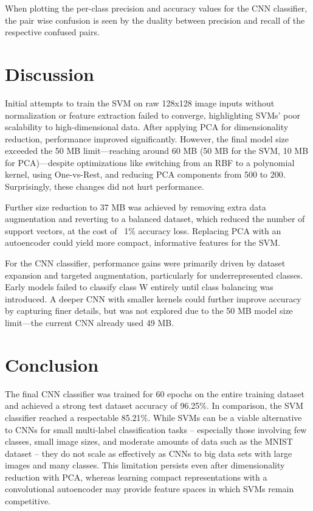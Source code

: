 \documentclass[a4, 10 pt, conference]{ieeeconf}  %
\begin{document}
When plotting the per-class precision and accuracy values for the CNN classifier,
the pair wise confusion is seen by the duality between precision and recall of the
respective confused pairs.

\section{Discussion}
\label{sec:discuss}

Initial attempts to train the SVM on raw 128x128 image inputs without normalization or feature extraction failed to converge, highlighting SVMs' poor scalability to high-dimensional data. After applying PCA for dimensionality reduction, performance improved significantly. However, the final model size exceeded the 50 MB limit—reaching around 60 MB (50 MB for the SVM, 10 MB for PCA)—despite optimizations like switching from an RBF to a polynomial kernel, using One-vs-Rest, and reducing PCA components from 500 to 200. Surprisingly, these changes did not hurt performance.

Further size reduction to 37 MB was achieved by removing extra data augmentation and reverting to a balanced dataset, which reduced the number of support vectors, at the cost of ~1\% accuracy loss. Replacing PCA with an autoencoder could yield more compact, informative features for the SVM.

For the CNN classifier, performance gains were primarily driven by dataset expansion and targeted augmentation, particularly for underrepresented classes. Early models failed to classify class W entirely until class balancing was introduced. A deeper CNN with smaller kernels could further improve accuracy by capturing finer details, but was not explored due to the 50 MB model size limit—the current CNN already used 49 MB.


\section{Conclusion}
\label{sec:con}

The final CNN classifier was trained for 60 epochs on the entire training
dataset and achieved a strong test dataset accuracy of 96.25\%. In comparison,
the SVM classifier reached a respectable 85.21\%. While SVMs can be a viable
alternative to CNNs for small multi-label classification tasks -- especially
those involving few classes, small image sizes, and moderate amounts of
data such as the MNIST dataset -- they do not scale as effectively as CNNs
to big data sets with large images and many classes. This limitation persists even after
dimensionality reduction with PCA, whereas learning compact representations
with a convolutional autoencoder may provide feature spaces in which SVMs remain competitive.


\end{document}
